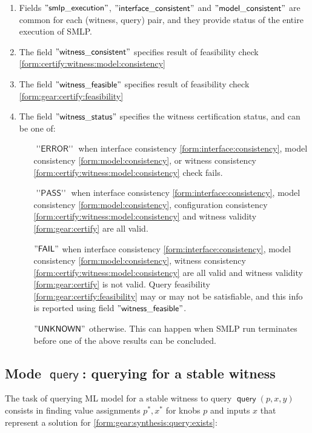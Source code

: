 \documentclass[a4paper,parskip=half]{article} %
\newcommand*\query{\operatorname{\mathsf{query}}}
\newcommand*\mode[1]{\operatorname{\mathsf{#1}}} %
\newcommand*\speckey[1]{\operatorname{\mathsf{"{#1}"}}} %
\newcommand*\specval[1]{\operatorname{\mathsf{{#1}}}} %
\begin{document}
\begin{enumerate}
\item Fields $\speckey{smlp\_execution}$,  $\speckey{interface\_consistent}$ and $\speckey{model\_consistent}$
are common for each (witness, query) pair, and they provide status of the entire execution of SMLP.
\item The field  $\speckey{witness\_consistent}$ specifies result of feasibility check \cref{form:certify:witness:model:consistency}
\item The field  $\speckey{witness\_feasible}$ specifies result of feasibility check \cref{form:gear:certify:feasibility}
\item The field  $\speckey{witness\_status}$ specifies the witness certification status, and can be one of:
\begin{itemize}
\item[$\specval{''ERROR''}$]  when interface consistency \cref{form:interface:consistency},
model consistency \cref{form:model:consistency}, or witness consistency \cref{form:certify:witness:model:consistency} check fails.
\item[$\specval{''PASS''}$]  when interface consistency \cref{form:interface:consistency}, 
model consistency \cref{form:model:consistency},  configuration consistency \cref{form:certify:witness:model:consistency} 
and  witness validity \cref{form:gear:certify}  are all valid.
\item[$\specval{"FAIL"}$]  when interface consistency \cref{form:interface:consistency}, 
model consistency \cref{form:model:consistency},  witness consistency \cref{form:certify:witness:model:consistency} 
are all valid and  witness validity \cref{form:gear:certify}  is not valid. 
Query feasibility \cref{form:gear:certify:feasibility} may or may not be satisfiable, and this info is reported
using field $\speckey{witness\_feasible}$.
\item[$\specval{"UNKNOWN"}$] otherwise. This can happen when SMLP run terminates before one of the above 
results can be concluded.
\end{itemize}
\end{enumerate}

\subsection{Mode $\mode{query}$: querying for a stable witness}


The task of querying ML model for a stable witness to query $\query(p, x, y)$ consists in finding value assignments  
$p^*,x^*$  for knobs $p$ and inputs $x$ that represent a solution for \cref{form:gear:synthesis:query:exists}:
\end{document}
